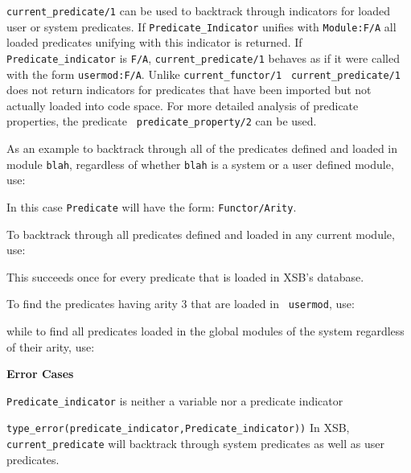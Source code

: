 \begin{description}
%
{\tt current\_predicate/1} can be used to backtrack through indicators
for loaded user or system predicates.  If {\tt Predicate\_Indicator}
unifies with {\tt Module:F/A} all loaded predicates unifying with this
indicator is returned.  If {\tt Predicate\_indicator} is {\tt F/A},
{\tt current\_predicate/1} behaves as if it were called with the form
{\tt usermod:F/A}.  Unlike {\tt current\_functor/1} {\tt
current\_predicate/1} does not return indicators for predicates that
have been imported but not actually loaded into code space.  For more
detailed analysis of predicate properties, the predicate {\tt
predicate\_property/2} can be used.

As an example to backtrack through all of the predicates defined and loaded in
module {\tt blah}, regardless of whether {\tt blah} is a system or a
user defined module, use:


    In this case {\tt Predicate} will have the form: {\tt Functor/Arity}.

    To backtrack through all predicates defined and loaded in any current 
    module, use:


    This succeeds once for every predicate that is loaded in XSB's
    database.

    To find the predicates having arity 3 that are loaded in {\tt
    usermod}, use:


    while to find all predicates loaded in the global modules of the system
    regardless of their arity, use:

%

\noindent
{\bf Error Cases}
\bi
\item 	{\tt Predicate\_indicator} is neither a variable nor a predicate indicator
\bi
\item 	{\tt type\_error(predicate\_indicator,Predicate\_indicator))}
\ei
\ei
%
\compatibility
%
In XSB, {\tt current\_predicate} will backtrack through system
predicates as well as user predicates.



\end{description}
